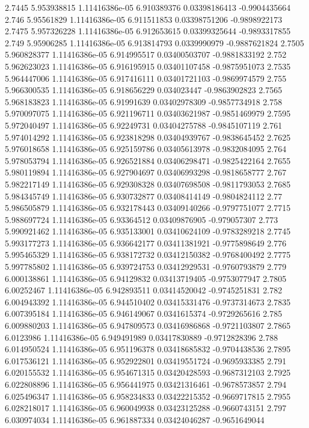 {2.7445 5.953938815 1.11416386e-05 6.910389376 0.03398186413 -0.9904435664
2.746 5.95561829 1.11416386e-05 6.911511853 0.03398751206 -0.9898922173
2.7475 5.957326228 1.11416386e-05 6.912653615 0.03399325644 -0.9893317855
2.749 5.95906285 1.11416386e-05 6.913814793 0.0339990979 -0.9887621824
2.7505 5.960828377 1.11416386e-05 6.914995517 0.03400503707 -0.9881833192
2.752 5.962623023 1.11416386e-05 6.916195915 0.03401107458 -0.9875951073
2.7535 5.964447006 1.11416386e-05 6.917416111 0.03401721103 -0.9869974579
2.755 5.966300535 1.11416386e-05 6.918656229 0.034023447 -0.9863902823
2.7565 5.968183823 1.11416386e-05 6.91991639 0.03402978309 -0.9857734918
2.758 5.970097075 1.11416386e-05 6.921196711 0.03403621987 -0.9851469979
2.7595 5.972040497 1.11416386e-05 6.92249731 0.03404275788 -0.9845107119
2.761 5.974014292 1.11416386e-05 6.923818298 0.03404939767 -0.9838645452
2.7625 5.976018658 1.11416386e-05 6.925159786 0.03405613978 -0.9832084095
2.764 5.978053794 1.11416386e-05 6.926521884 0.03406298471 -0.9825422164
2.7655 5.980119894 1.11416386e-05 6.927904697 0.03406993298 -0.9818658777
2.767 5.982217149 1.11416386e-05 6.929308328 0.03407698508 -0.9811793053
2.7685 5.984345749 1.11416386e-05 6.930732877 0.03408414149 -0.9804824112
2.77 5.986505879 1.11416386e-05 6.932178443 0.03409140266 -0.9797751077
2.7715 5.988697724 1.11416386e-05 6.93364512 0.03409876905 -0.979057307
2.773 5.990921462 1.11416386e-05 6.935133001 0.03410624109 -0.9783289218
2.7745 5.993177273 1.11416386e-05 6.936642177 0.03411381921 -0.9775898649
2.776 5.995465329 1.11416386e-05 6.938172732 0.03412150382 -0.9768400492
2.7775 5.997785802 1.11416386e-05 6.939724753 0.03412929531 -0.9760793879
2.779 6.000138861 1.11416386e-05 6.94129832 0.03413719405 -0.9753077947
2.7805 6.00252467 1.11416386e-05 6.942893511 0.03414520042 -0.9745251831
2.782 6.004943392 1.11416386e-05 6.944510402 0.03415331476 -0.9737314673
2.7835 6.007395184 1.11416386e-05 6.946149067 0.0341615374 -0.9729265616
2.785 6.009880203 1.11416386e-05 6.947809573 0.03416986868 -0.9721103807
2.7865 6.0123986 1.11416386e-05 6.949491989 0.03417830889 -0.9712828396
2.788 6.014950524 1.11416386e-05 6.951196378 0.03418685832 -0.9704438536
2.7895 6.017536121 1.11416386e-05 6.952922801 0.03419551724 -0.9695933385
2.791 6.020155532 1.11416386e-05 6.954671315 0.03420428593 -0.9687312103
2.7925 6.022808896 1.11416386e-05 6.956441975 0.03421316461 -0.9678573857
2.794 6.025496347 1.11416386e-05 6.958234833 0.03422215352 -0.9669717815
2.7955 6.028218017 1.11416386e-05 6.960049938 0.03423125288 -0.9660743151
2.797 6.030974034 1.11416386e-05 6.961887334 0.03424046287 -0.9651649044
}
